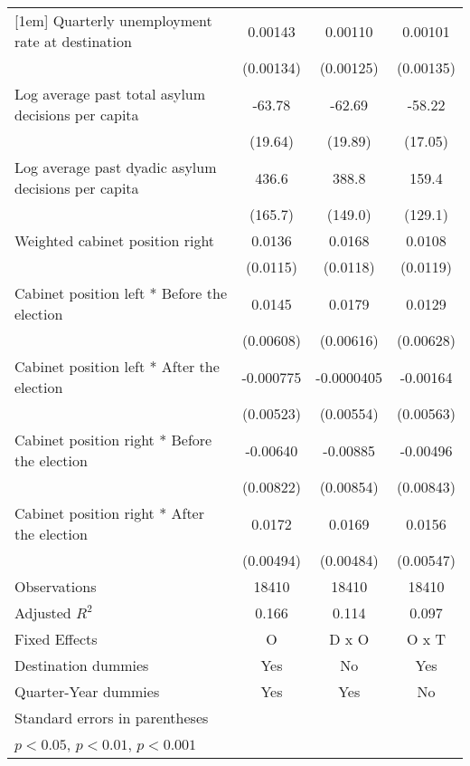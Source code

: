 \begin{table}[htbp]
\begin{tabular}{l*{3}{c}}
[1em]
Quarterly unemployment rate at destination&     0.00143         &     0.00110         &     0.00101         \\
                    &   (0.00134)         &   (0.00125)         &   (0.00135)         \\
[1em]
Log average past total asylum decisions per capita&      -63.78\sym{**} &      -62.69\sym{**} &      -58.22\sym{**} \\
                    &     (19.64)         &     (19.89)         &     (17.05)         \\
[1em]
Log average past dyadic asylum decisions per capita&       436.6\sym{*}  &       388.8\sym{*}  &       159.4         \\
                    &     (165.7)         &     (149.0)         &     (129.1)         \\
[1em]
Weighted cabinet position right&      0.0136         &      0.0168         &      0.0108         \\
                    &    (0.0115)         &    (0.0118)         &    (0.0119)         \\
[1em]
Cabinet position left * Before the election&      0.0145\sym{*}  &      0.0179\sym{**} &      0.0129\sym{*}  \\
                    &   (0.00608)         &   (0.00616)         &   (0.00628)         \\
[1em]
Cabinet position left * After the election&   -0.000775         &  -0.0000405         &    -0.00164         \\
                    &   (0.00523)         &   (0.00554)         &   (0.00563)         \\
[1em]
Cabinet position right * Before the election&    -0.00640         &    -0.00885         &    -0.00496         \\
                    &   (0.00822)         &   (0.00854)         &   (0.00843)         \\
[1em]
Cabinet position right * After the election&      0.0172\sym{**} &      0.0169\sym{**} &      0.0156\sym{**} \\
                    &   (0.00494)         &   (0.00484)         &   (0.00547)         \\
\hline
Observations        &       18410         &       18410         &       18410         \\
Adjusted \(R^{2}\)  &       0.166         &       0.114         &       0.097         \\
Fixed Effects       &           O         &       D x O         &       O x T         \\
Destination dummies &         Yes         &          No         &         Yes         \\
Quarter-Year dummies&         Yes         &         Yes         &          No         \\
\hline\hline
\multicolumn{4}{l}{\footnotesize Standard errors in parentheses}\\
\multicolumn{4}{l}{\footnotesize \sym{*} \(p<0.05\), \sym{**} \(p<0.01\), \sym{***} \(p<0.001\)}\\
\end{tabular}
\end{table}
